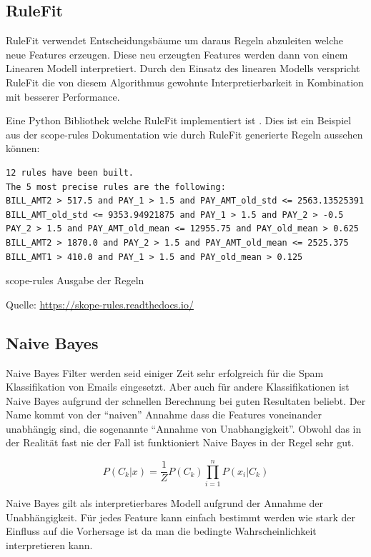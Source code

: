 \documentclass[
  12pt, %
  a4paper, %
  oneside, %
  openany, 
  numbers=noenddot, %
  BCOR=5mm, %
  parskip=half*, %
  thesis, %
]{bfhbook}
\begin{document}
\subsection{RuleFit}
\label{RF}
RuleFit \parencite{Friedman2008} verwendet Entscheidungsbäume um daraus Regeln abzuleiten welche neue Features erzeugen. Diese neu erzeugten Features werden dann von einem Linearen Modell interpretiert. Durch den Einsatz des linearen Modells verspricht RuleFit die von diesem Algorithmus gewohnte Interpretierbarkeit in Kombination mit besserer Performance.

Eine Python Bibliothek welche RuleFit implementiert ist \parencite{scopeRules}. Dies ist ein Beispiel aus der scope-rules Dokumentation wie durch RuleFit generierte Regeln aussehen können:
\begin{minipage}[t]{\linewidth}
\begin{lstlisting}
12 rules have been built.
The 5 most precise rules are the following:
BILL_AMT2 > 517.5 and PAY_1 > 1.5 and PAY_AMT_old_std <= 2563.13525391
BILL_AMT_old_std <= 9353.94921875 and PAY_1 > 1.5 and PAY_2 > -0.5
PAY_2 > 1.5 and PAY_AMT_old_mean <= 12955.75 and PAY_old_mean > 0.625
BILL_AMT2 > 1870.0 and PAY_2 > 1.5 and PAY_AMT_old_mean <= 2525.375
BILL_AMT1 > 410.0 and PAY_1 > 1.5 and PAY_old_mean > 0.125
\end{lstlisting}
\caption {scope-rules Ausgabe der Regeln}
\caption*{Quelle: \url{https://skope-rules.readthedocs.io/}}
\end{minipage}

\subsection{Naive Bayes}
Naive Bayes Filter werden seid einiger Zeit sehr erfolgreich für die Spam Klassifikation von Emails eingesetzt. Aber auch für andere Klassifikationen ist Naive Bayes aufgrund der schnellen Berechnung bei guten Resultaten beliebt. Der Name kommt von der ``naiven'' Annahme dass die Features voneinander unabhängig sind, die sogenannte  ``Annahme von Unabhangigkeit''. Obwohl das in der Realität fast nie der Fall ist funktioniert Naive Bayes in der Regel sehr gut.

\[ P(C_k|x) = \frac{1}{Z}P(C_k) \prod_{i=1}^{n}  P(x_i|C_k) \]

Naive Bayes gilt als interpretierbares Modell aufgrund der Annahme der Unabhängigkeit. Für jedes Feature kann einfach bestimmt werden wie stark der Einfluss auf die Vorhersage ist da man die bedingte Wahrscheinlichkeit interpretieren kann.
\end{document}
